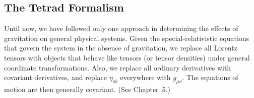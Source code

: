 %
%
%

\subsection{The Tetrad Formalism\optionalreading}\label{sec:12.5}
\begingroup
\renewcommand{\thefootnote}{*}
\begin{NoHyper}
\end{NoHyper}
\endgroup

Until now, we have followed only one approach in determining the effects of
gravitation on general physical systems. Given the special-relativistic
equations that govern the system in the absence of gravitation, we replace
all Lorentz tensors with objects that behave like tensors (or tensor
densities) under general coordinate transformations. Also, we replace all
ordinary derivatives with covariant derivatives, and replace
\(\eta_{ab}\) everywhere with \(g_{\mu\nu}\). The equations of motion are
then generally covariant. (See Chapter~5.)

